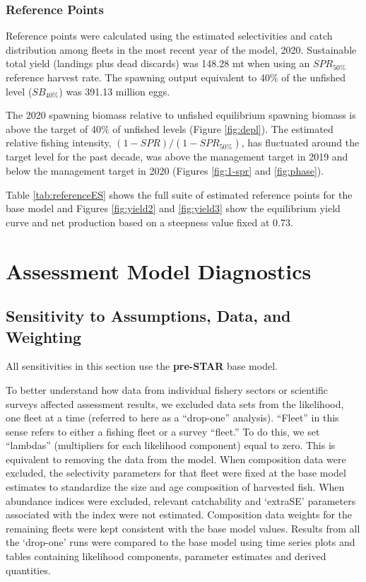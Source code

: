 \documentclass[
  english,
  a4paper,
]{article}
\begin{document}
\hypertarget{reference-points-1}{%
\subsubsection{Reference Points}\label{reference-points-1}}

Reference points were calculated using the estimated selectivities and catch distribution among fleets in the most recent year of the model, 2020.
Sustainable total yield (landings plus dead discards) was
148.28 mt when using an \(SPR_{50\%}\)
reference harvest rate. The spawning output equivalent to 40\% of the unfished level (\(SB_{40\%}\)) was 391.13
million eggs.

The 2020 spawning biomass relative to unfished equilibrium spawning biomass is above the target of 40\% of unfished levels (Figure \ref{fig:depl}).
The estimated relative fishing intensity, \((1-SPR)/(1-SPR_{50\%})\), has fluctuated around the target level for the past decade, was above the management target in 2019 and below the management target in 2020 (Figures \ref{fig:1-spr} and \ref{fig:phase}).

Table \ref{tab:referenceES} shows the full suite of estimated reference points for the base model and Figures \ref{fig:yield2} and \ref{fig:yield3} show the equilibrium yield curve and net production based on a steepness value fixed at 0.73.

\hypertarget{assessment-model-diagnostics}{%
\section{Assessment Model Diagnostics}\label{assessment-model-diagnostics}}

\hypertarget{sensitivity-to-assumptions-data-and-weighting}{%
\subsection{Sensitivity to Assumptions, Data, and Weighting}\label{sensitivity-to-assumptions-data-and-weighting}}

All sensitivities in this section use the \textbf{pre-STAR} base model.

To better understand how data from individual fishery sectors or scientific surveys affected assessment results, we excluded data sets from the likelihood, one fleet at a time (referred to here as a ``drop-one'' analysis). ``Fleet'' in this sense refers to either a fishing fleet or a survey ``fleet.'' To do this, we set ``lambdas'' (multipliers for each likelihood component) equal to zero. This is equivalent to removing the data from the model. When composition data were excluded, the selectivity parameters for that fleet were fixed at the base model estimates to standardize the size and age composition of harvested fish. When abundance indices were excluded, relevant catchability and `extraSE' parameters associated with the index were not estimated. Composition data weights for the remaining fleets were kept consistent with the base model values. Results from all the `drop-one' runs were compared to the base model using time series plots and tables containing likelihood components, parameter estimates and derived quantities.
\end{document}
